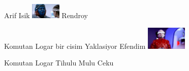 \documentclass{exam}
\begin{document}
\begin{questions}
\begin{oneparchoices}
Arif Isik
\choice \includegraphics[height=2em]{rendroy2.jpg}
Rendroy
\end{oneparchoices}
\question Komutan Logar bir cisim Yaklasiyor Efendim\newline
\includegraphics[height=3em]{tihulu.jpeg} \newline
\begin{oneparchoices}
\choice Komutan Logar
\choice Tihulu
\choice Mulu
\choice Ceku
\end{oneparchoices}
\end{questions}
\end{document}

